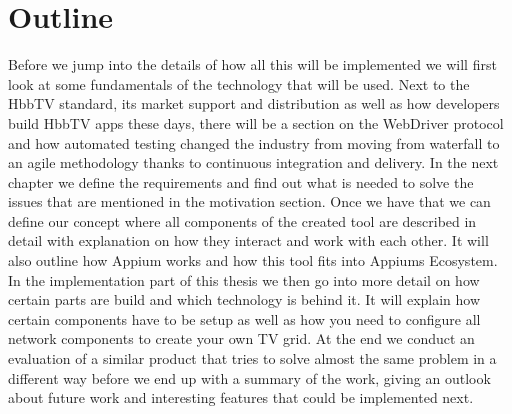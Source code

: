 \section{Outline\label{sec:outline}}

Before we jump into the details of how all this will be implemented we will first look at some fundamentals
of the technology that will be used. Next to the HbbTV standard, its market support and distribution as well
as how developers build HbbTV apps these days, there will be a section on the WebDriver protocol and how
automated testing changed the industry from moving from waterfall to an agile methodology thanks to
continuous integration and delivery. In the next chapter we define the requirements and find out what is
needed to solve the issues that are mentioned in the motivation section. Once we have that we can define
our concept where all components of the created tool are described in detail with explanation on how they
interact and work with each other. It will also outline how Appium works and how this tool fits into
Appiums Ecosystem. In the implementation part of this thesis we then go into more detail on how certain
parts are build and which technology is behind it. It will explain how certain components have to be
setup as well as how you need to configure all network components to create your own TV grid. At the
end we conduct an evaluation of a similar product that tries to solve almost the same problem in a
different way before we end up with a summary of the work, giving an outlook about future work and
interesting features that could be implemented next.
